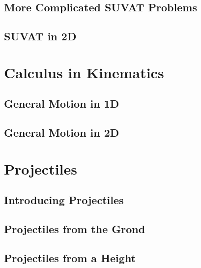 \documentclass[../alevelmaths.tex]{subfiles}
\begin{document}
\subsection*{More Complicated SUVAT Problems}
\subsection*{SUVAT in 2D}
\section{Calculus in Kinematics}
\subsection*{General Motion in 1D}
\subsection*{General Motion in 2D}
\section{Projectiles}
\subsection*{Introducing Projectiles}
\subsection*{Projectiles from the Grond}
\subsection*{Projectiles from a Height}
\end{document}
